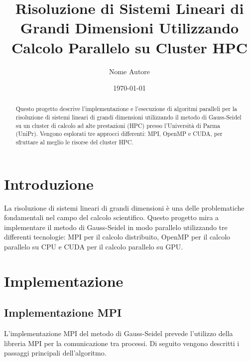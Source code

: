 \documentclass[a4paper,12pt]{article}
\title{Risoluzione di Sistemi Lineari di Grandi Dimensioni Utilizzando Calcolo Parallelo su Cluster HPC}
\author{Nome Autore}
\date{\today}
\begin{document}
\maketitle

\begin{abstract}
Questo progetto descrive l'implementazione e l'esecuzione di algoritmi paralleli per la risoluzione di sistemi lineari di grandi dimensioni utilizzando il metodo di Gauss-Seidel su un cluster di calcolo ad alte prestazioni (HPC) presso l'Università di Parma (UniPr). Vengono esplorati tre approcci differenti: MPI, OpenMP e CUDA, per sfruttare al meglio le risorse del cluster HPC.
\end{abstract}

\tableofcontents

\section{Introduzione}
La risoluzione di sistemi lineari di grandi dimensioni è una delle problematiche fondamentali nel campo del calcolo scientifico. Questo progetto mira a implementare il metodo di Gauss-Seidel in modo parallelo utilizzando tre differenti tecnologie: MPI per il calcolo distribuito, OpenMP per il calcolo parallelo su CPU e CUDA per il calcolo parallelo su GPU.

\section{Implementazione}

\subsection{Implementazione MPI}
L'implementazione MPI del metodo di Gauss-Seidel prevede l'utilizzo della libreria MPI per la comunicazione tra processi. Di seguito vengono descritti i passaggi principali dell'algoritmo.
\end{document}
